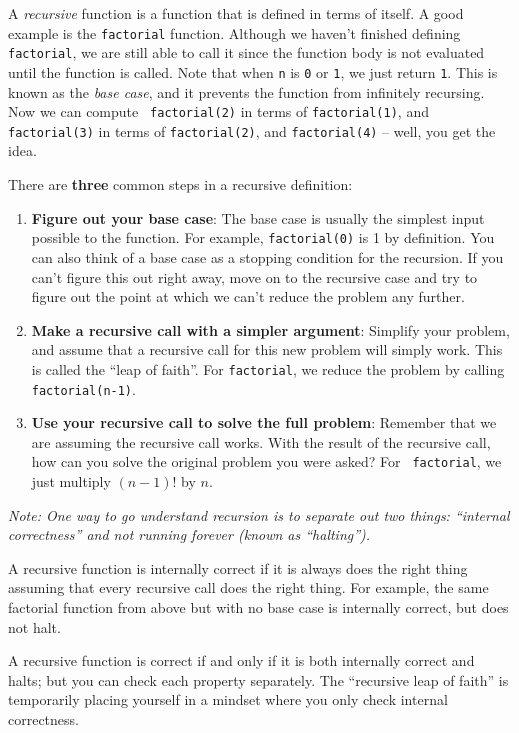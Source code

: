 A {\it recursive} function is a function that is defined in terms of itself.
A good example is the {\tt factorial} function. Although we haven't finished defining
\texttt{factorial}, we are still able to call it since the function body is not
evaluated until the function is called. Note that when {\tt n} is {\tt 0} or
{\tt 1}, we just return {\tt 1}. This is known as the {\it base case}, and it
prevents the function from infinitely recursing.  Now we can compute {\tt
factorial(2)} in terms of {\tt factorial(1)}, and {\tt factorial(3)} in terms
of {\tt factorial(2)}, and {\tt factorial(4)} -- well, you get the idea.

There are \textbf{three} common steps in a recursive definition:

\begin{enumerate}
\item \textbf{Figure out your base case}: The base case is usually the simplest
input possible to the function. For example, {\tt factorial(0)} is 1 by
definition. You can also think of a base case as a stopping condition for the
recursion. If you can't figure this out right away, move on to the recursive
case and try to figure out the point at which we can't reduce the problem any
further.
\item \textbf{Make a recursive call with a simpler argument}: Simplify your
problem, and assume that a recursive call for this new problem will simply
work. This is called the ``leap of faith''. For {\tt factorial}, we reduce the
problem by calling {\tt factorial(n-1)}.
\item \textbf{Use your recursive call to solve the full problem}: Remember that
we are assuming the recursive call works. With the result of the recursive
call, how can you solve the original problem you were asked? For {\tt
factorial}, we just multiply $(n-1)!$ by $n$.
\end{enumerate}

{\em \small Note: One way to go understand recursion is to separate out two things: ``internal correctness''
and not running forever (known as ``halting'').

A recursive function is internally correct
if it is always does the right thing assuming that every recursive call does the right thing.
For example, the same factorial function from above but with no base case is internally
correct, but does not halt.

A recursive function is correct if and only if it is
both internally correct and halts; but you can check each property separately. The
``recursive leap of faith'' is temporarily placing yourself in a mindset where you only
check internal correctness.}
